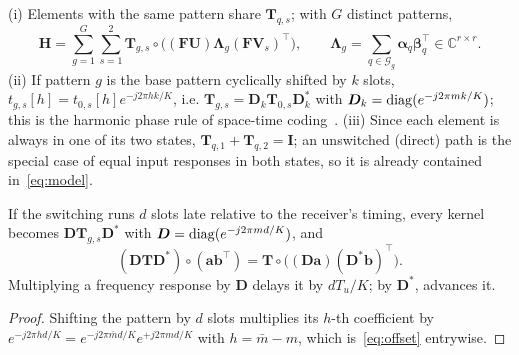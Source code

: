\begin{corollary}\label{cor:groups}
(i) Elements with the same pattern share $\bm T_{q,s}$; with $G$ distinct patterns,
\begin{equation}
\bm H=\sum_{g=1}^{G}\sum_{s=1}^{2}\bm T_{g,s}\circ\big((\bm F\bm U)\bm\Lambda_g(\bm F\bm V_s)^{\top}\big),
\qquad\bm\Lambda_g=\textstyle\sum_{q\in\mathcal G_g}\bm\alpha_q\bm\beta_q^{\top}\in\mathbb C^{r\times r}.
\label{eq:model}
\end{equation}
(ii) If pattern $g$ is the base pattern cyclically shifted by $k$ slots,
$t_{g,s}[h]=t_{0,s}[h]e^{-j2\pi hk/K}$, i.e. $\bm T_{g,s}=\bm D_k\bm T_{0,s}\bm D_k^{*}$ with
$\bm D_k=\operatorname{diag}(e^{-j2\pi mk/K})$; this is the harmonic phase rule of space-time
coding~\cite{zhang2018}. (iii) Since each element is always in one of its two states,
$\bm T_{q,1}+\bm T_{q,2}=\bm I$; an unswitched (direct) path is the special case of equal
input responses in both states, so it is already contained in~\eqref{eq:model}.
\end{corollary}

\begin{proposition}\label{prop:offset}
If the switching runs $d$ slots late relative to the receiver's timing, every kernel
becomes $\bm D\bm T_{g,s}\bm D^{*}$ with $\bm D=\operatorname{diag}(e^{-j2\pi md/K})$, and
\begin{equation}
(\bm D\bm T\bm D^{*})\circ(\bm a\bm b^{\top})=\bm T\circ\big((\bm D\bm a)(\bm D^{*}\bm b)^{\top}\big).
\label{eq:offset}
\end{equation}
Multiplying a frequency response by $\bm D$ delays it by $dT_u/K$; by $\bm D^{*}$, advances it.
\end{proposition}
\begin{proof}
Shifting the pattern by $d$ slots multiplies its $h$-th coefficient by $e^{-j2\pi hd/K}=
e^{-j2\pi\bar md/K}e^{+j2\pi md/K}$ with $h=\bar m-m$, which is~\eqref{eq:offset} entrywise.
\end{proof}

